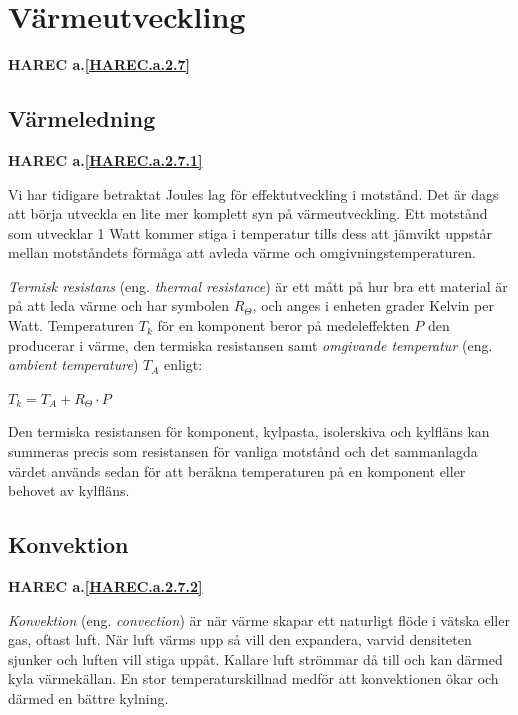 \section{Värmeutveckling}

\textbf{
HAREC a.\ref{HAREC.a.2.7}\label{myHAREC.a.2.7}
}


\subsection{Värmeledning}

\textbf{
HAREC a.\ref{HAREC.a.2.7.1}\label{myHAREC.a.2.7.1}
}


Vi har tidigare betraktat Joules lag för effektutveckling i motstånd.
Det är dags att börja utveckla en lite mer komplett syn på värmeutveckling.
Ett motstånd som utvecklar 1 Watt kommer stiga i temperatur tills dess att
jämvikt uppstår mellan motståndets förmåga att avleda värme och
omgivningstemperaturen.

\emph{Termisk resistans} (eng. \emph{thermal resistance}) är ett mått på
hur bra ett material är på att leda värme och har symbolen \(R_\Theta\),
och anges i enheten grader Kelvin per Watt. Temperaturen \(T_k\) för en
komponent beror på medeleffekten \(P\) den producerar i värme, den
termiska resistansen samt \emph{omgivande temperatur} (eng. 
\emph{ambient temperature}) \(T_A\) enligt:

\(T_k = T_A + R_\Theta \cdot P\)

Den termiska resistansen för komponent, kylpasta, isolerskiva och kylfläns
kan summeras precis som resistansen för vanliga motstånd och det
sammanlagda värdet används sedan för att beräkna temperaturen på en
komponent eller behovet av kylfläns.

\subsection{Konvektion}
\textbf{
HAREC a.\ref{HAREC.a.2.7.2}\label{myHAREC.a.2.7.2}
}

\emph{Konvektion} (eng. \emph{convection}) är när värme skapar ett
naturligt flöde i vätska eller gas, oftast luft. När luft värms upp så
vill den expandera, varvid densiteten sjunker och luften vill stiga uppåt.
Kallare luft strömmar då till och kan därmed kyla värmekällan. En stor
temperaturskillnad medför att konvektionen ökar och därmed en bättre
kylning.

